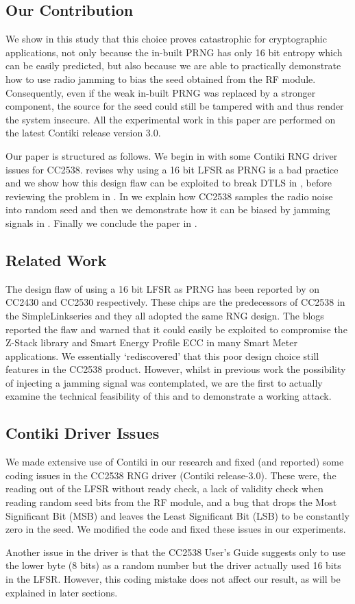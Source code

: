 \subsection{Our Contribution}
We show in this study that this choice proves catastrophic for cryptographic applications, not only because the in-built PRNG has only 16 bit entropy which can be easily predicted, but also because we are able to practically demonstrate how to use radio jamming to bias the seed obtained from the RF module. Consequently, even if the weak in-built PRNG was replaced by a stronger component, the source for the seed could still be tampered with and thus render the system insecure. All the experimental work in this paper are performed on the latest Contiki release version 3.0.

Our paper is structured as follows. We begin in  with some Contiki RNG driver issues for CC2538.  revises why using a 16 bit LFSR as PRNG is a bad practice and we show how this design flaw can be exploited to break DTLS in , before reviewing the problem in . In  we explain how CC2538 samples the radio noise into random seed and then we demonstrate how it can be biased by jamming signals in . Finally we conclude the paper in .

\subsection{Related Work}
The design flaw of using a 16 bit LFSR as PRNG has been reported by \cite{SmartMeterBlog}\cite{CC2530PRNG} on CC2430\cite{CC2430Manual} and CC2530\cite{CC2530Manual} respectively. These chips are the predecessors of CC2538 in the SimpleLink\texttrademark  series and they all adopted the same RNG design. The blogs reported the flaw and warned that it could easily be exploited to compromise the Z-Stack library\cite{ZStack} and Smart Energy Profile ECC in many Smart Meter applications. We essentially `rediscovered' that this poor design choice still features in the CC2538 product. However, whilst in previous work the possibility of injecting a jamming signal was contemplated, we are the first to actually examine the technical feasibility of this and to demonstrate a working attack.


\subsection{Contiki Driver Issues}\label{ContikiDriverIssue}
We made extensive use of Contiki in our research and fixed (and reported) some coding issues in the CC2538 RNG driver (Contiki release-3.0). These were, the reading out of the LFSR without ready check, a lack of validity check when reading random seed bits from the RF module, and a bug that drops the Most Significant Bit (MSB) and leaves the Least Significant Bit (LSB) to be constantly zero in the seed.  We modified the code and fixed these issues in our experiments. 

Another issue in the driver is that the CC2538 User's Guide\cite{CC2538Manual} suggests only to use the lower byte (8 bits) as a random number but the driver actually used 16 bits in the LFSR. However, this coding mistake does not affect our result, as will be explained in  later sections.